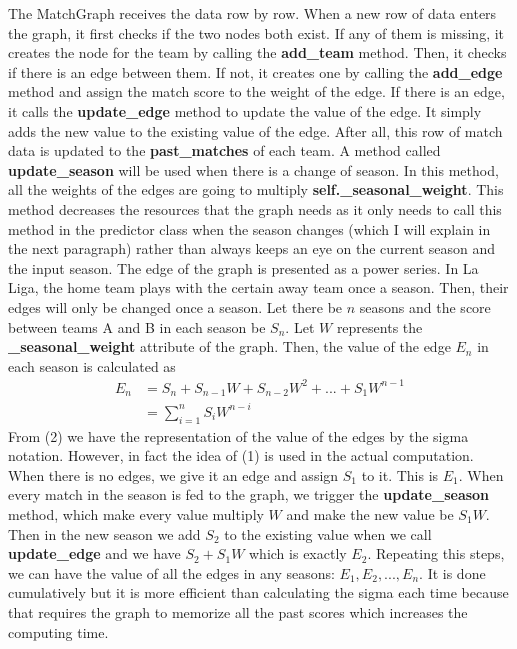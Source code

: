 \documentclass[fontsize=11pt]{article}
\begin{document}
The MatchGraph receives the data row by row. When a new row of data enters the graph, it first checks if the two nodes both exist. If any of them is missing, it creates the node for the team by calling the \textbf{add\_team} method. Then, it checks if there is an edge between them. If not, it creates one by calling the \textbf{add\_edge} method and assign the match score to the weight of the edge. If there is an edge, it calls the \textbf{update\_edge} method to update the value of the edge. It simply adds the new value to the existing value of the edge. After all, this row of match data is updated to the \textbf{past\_matches} of each team. A method called \textbf{update\_season} will be used when there is a change of season. In this method, all the weights of the edges are going to multiply \textbf{self.\_seasonal\_weight}. This method decreases the resources that the graph needs as it only needs to call this method in the predictor class when the season changes (which I will explain in the next paragraph) rather than always keeps an eye on the current season and the input season.
\newline
\newline
The edge of the graph is presented as a power series. In La Liga, the home team plays with the certain away team once a season. Then, their edges will only be changed once a season. Let there be $n$ seasons and the score between teams A and B in each season be $S_n$. Let $W$ represents the \textbf{\_seasonal\_weight} attribute of the graph. Then, the value of the edge $E_n$ in each season is calculated as 
\begin{align}
    E_n &= S_n + S_{n-1} W + S_{n-2}W^2 + ... + S_1 W^{n-1} \\
    &=\sum_{i = 1}^{n}S_i W^{n-i}
\end{align}
From (2) we have the representation of the value of the edges by the sigma notation. However, in fact the idea of (1) is used in the actual computation. When there is no edges, we give it an edge and assign $S_1$ to it. This is $E_1$. When every match in the season is fed to the graph, we trigger the \textbf{update\_season} method, which make every value multiply $W$ and make the new value be $S_1 W$. Then in the new season we add $S_2$ to the existing value when we call \textbf{update\_edge} and we have $S_2 + S_1 W$ which is exactly $E_2$. Repeating this steps, we can have the value of all the edges in any seasons: $E_1, E_2, ..., E_n$. It is done cumulatively but it is more efficient than calculating the sigma each time because that requires the graph to memorize all the past scores which increases the computing time.
\end{document}
